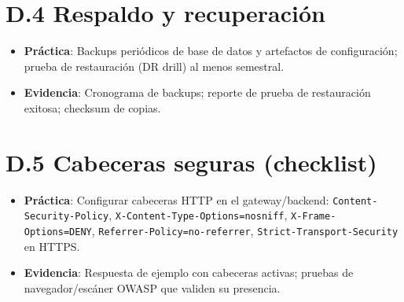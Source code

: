 \documentclass[12pt,a4paper,oneside]{report}
\begin{document}
\section*{D.4 Respaldo y recuperación}
\begin{itemize}
  \item \textbf{Práctica}: Backups periódicos de base de datos y artefactos de configuración; prueba de restauración (DR drill) al menos semestral.
  \item \textbf{Evidencia}: Cronograma de backups; reporte de prueba de restauración exitosa; checksum de copias.
\end{itemize}

\section*{D.5 Cabeceras seguras (checklist)}
\begin{itemize}
  \item \textbf{Práctica}: Configurar cabeceras HTTP en el gateway/backend: \texttt{Content-Security-Policy}, \texttt{X-Content-Type-Options=nosniff}, \texttt{X-Frame-Options=DENY}, \texttt{Referrer-Policy=no-referrer}, \texttt{Strict-Transport-Security} en HTTPS.
  \item \textbf{Evidencia}: Respuesta de ejemplo con cabeceras activas; pruebas de navegador/escáner OWASP que validen su presencia.
\end{itemize}
\end{document}
